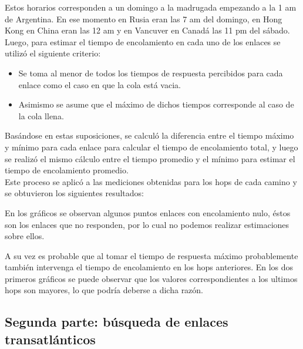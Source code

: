 

Estos horarios corresponden a un domingo a la madrugada empezando a la 1 am de Argentina. En ese momento en Rusia eran las 7 am del domingo, en Hong Kong en China eran las 12 am y en Vancuver en Canad\'a las 11 pm del s\'abado. \\

Luego, para estimar el tiempo de encolamiento en cada uno de los enlaces se utilizó el siguiente criterio:
\begin{itemize}
\item Se toma al menor de todos los tiempos de respuesta percibidos para cada enlace como el caso en que la cola está vacia.
\item Asimismo se asume que el máximo de dichos tiempos corresponde al caso de la cola llena.
\end{itemize}
Basándose en estas suposiciones, se calculó la diferencia entre el tiempo máximo y mínimo para cada enlace para calcular el tiempo de encolamiento total, y luego se realizó el mismo
cálculo entre el tiempo promedio y el mínimo para estimar el tiempo de encolamiento promedio. \\

Este proceso se aplicó a las mediciones obtenidas para los hops de cada camino y se obtuvieron los siguientes resultados:


En los gráficos se observan algunos puntos enlaces con encolamiento nulo, éstos son los enlaces que no responden, por lo cual no podemos realizar estimaciones sobre ellos.

A su vez es probable que al tomar el tiempo de respuesta máximo probablemente también intervenga el tiempo de encolamiento en los hops anteriores. En los dos primeros gráficos se
puede observar que los valores correspondientes a los ultimos hops son mayores, lo que podría deberse a dicha razón.

\subsection{Segunda parte: búsqueda de enlaces transatlánticos}

